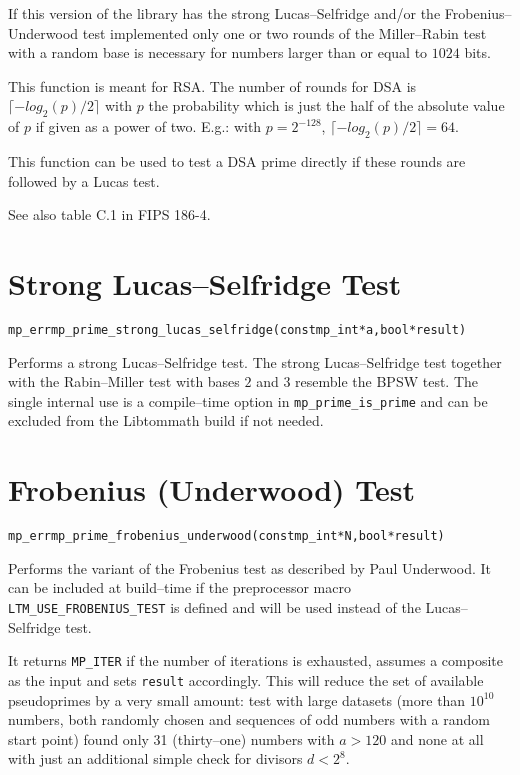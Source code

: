 \documentclass[synpaper]{book}
\begin{document}
If this version of the library has the strong Lucas--Selfridge and/or the Frobenius--Underwood test
implemented only one or two rounds of the Miller--Rabin test with a random base is necessary for
numbers larger than or equal to $1024$ bits.

This function is meant for RSA. The number of rounds for DSA is $\lceil -log_2(p)/2\rceil$ with $p$
the probability which is just the half of the absolute value of $p$ if given as a power of two.
E.g.: with $p = 2^{-128}$, $\lceil -log_2(p)/2\rceil = 64$.

This function can be used to test a DSA prime directly if these rounds are followed by a Lucas
test.

See also table C.1 in FIPS 186-4.

\section{Strong Lucas--Selfridge Test}
\begin{alltt}
mp_err mp_prime_strong_lucas_selfridge(const mp_int *a, bool *result)
\end{alltt}
Performs a strong Lucas--Selfridge test. The strong Lucas--Selfridge test together with the
Rabin--Miller test with bases $2$ and $3$ resemble the BPSW test. The single internal use is a
compile--time option in \texttt{mp\_prime\_is\_prime} and can be excluded from the Libtommath build
if not needed.

\section{Frobenius (Underwood) Test}
\begin{alltt}
mp_err mp_prime_frobenius_underwood(const mp_int *N, bool *result)
\end{alltt}
Performs the variant of the Frobenius test as described by Paul Underwood. It can be included at
build--time if the preprocessor macro \texttt{LTM\_USE\_FROBENIUS\_TEST} is defined and will be
used
instead of the Lucas--Selfridge test.

It returns \texttt{MP\_ITER} if the number of iterations is exhausted, assumes a composite as the
input and sets \texttt{result} accordingly. This will reduce the set of available pseudoprimes by a
very small amount: test with large datasets (more than $10^{10}$ numbers, both randomly chosen and
sequences of odd numbers with a random start point) found only 31 (thirty--one) numbers with $a >
  120$ and none at all with just an additional simple check for divisors $d < 2^8$.
\end{document}
